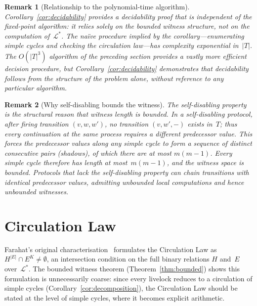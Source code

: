 \documentclass{article}
\newtheorem{remark}{Remark}
\newcommand{\Ls}{\mathcal{L}^{*}}
\begin{document}
\begin{remark}[Relationship to the polynomial-time algorithm]
Corollary~\ref{cor:decidability} provides a decidability
proof that is independent of the fixed-point algorithm:
it relies solely on the bounded witness structure, not
on the computation of~$\Ls$.
The na\"ive procedure implied by the corollary---enumerating
simple cycles and checking the circulation law---has
complexity exponential in~$|T|$.
The $O(|T|^3)$ algorithm of the preceding section provides
a vastly more efficient decision procedure, but
Corollary~\ref{cor:decidability} demonstrates that
decidability follows from the structure of the problem
alone, without reference to any particular algorithm.
\end{remark}

\begin{remark}[Why self-disabling bounds the witness]
\label{rem:why}
The self-disabling property is the structural reason that
witness length is bounded.
In a self-disabling protocol, after firing
transition $(v, w, w')$, no transition $(v, w', {-})$
exists in~$T$; thus every continuation at the same process
requires a \emph{different} predecessor value.
This forces the predecessor values along any simple cycle
to form a sequence of distinct consecutive pairs (shadows),
of which there are at most $m(m{-}1)$.
Every simple cycle therefore has length at most~$m(m{-}1)$,
and the witness space is bounded.
Protocols that lack the self-disabling property can chain
transitions with identical predecessor values, admitting
unbounded local computations and hence unbounded witnesses.
\end{remark}

\section{Circulation Law}
\label{sec:circulation}

Farahat's original characterisation~\citep{farahat2012} formulates the
Circulation Law as $H^{|E|}\cap E^K\neq\emptyset$, an intersection
condition on the full binary relations $H$ and~$E$ over~$\Ls$.
The bounded witness theorem (Theorem~\ref{thm:bounded}) shows this
formulation is unnecessarily coarse: since every livelock reduces to
a circulation of simple cycles
(Corollary~\ref{cor:decomposition}), the Circulation Law should be
stated at the level of simple cycles, where it becomes explicit
arithmetic.
\end{document}
